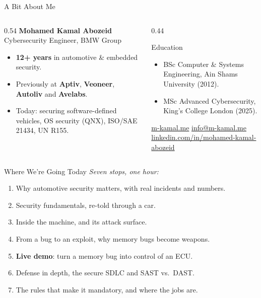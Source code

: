 
\begin{frame}{A Bit About Me}
  \begin{columns}[T]
    \begin{column}{0.54\textwidth}
      \textbf{Mohamed Kamal Abozeid}\\[2pt]
      {\small Cybersecurity Engineer, BMW Group}
      \vspace{3mm}
      \begin{itemize}
        \item \textbf{12+ years} in automotive \& embedded security.
        \item Previously at \textbf{Aptiv}, \textbf{Veoneer}, \textbf{Autoliv} and \textbf{Avelabs}.
        \item Today: securing software-defined vehicles, OS security (QNX), ISO/SAE 21434, UN R155.
      \end{itemize}
    \end{column}
    \begin{column}{0.44\textwidth}
      \begin{block}{Education}
        \begin{itemize}
          \item BSc Computer \& Systems Engineering, Ain Shams University (2012).
          \item MSc Advanced Cybersecurity, King's College London (2025).
        \end{itemize}
      \end{block}
      \vspace{2mm}
      {\footnotesize \url{m-kamal.me} \;\textbullet\; \href{mailto:info@m-kamal.me}{info@m-kamal.me}\\ \href{https://www.linkedin.com/in/mohamed-kamal-abozeid-814985b4/}{linkedin.com/in/mohamed-kamal-abozeid}}
    \end{column}
  \end{columns}
\end{frame}

\begin{frame}{Where We're Going Today}
  \textit{Seven stops, one hour:}
  \vspace{2.5mm}
  \begin{enumerate}\setlength{\itemsep}{4pt}
    \item Why automotive security matters, with real incidents and numbers.
    \item Security fundamentals, re-told through a car.
    \item Inside the machine, and its attack surface.
    \item From a bug to an exploit, why memory bugs become weapons.
    \item \alert{\textbf{Live demo}: turn a memory bug into control of an ECU.}
    \item Defense in depth, the secure SDLC and SAST vs.\ DAST.
    \item The rules that make it mandatory, and where the jobs are.
  \end{enumerate}
\end{frame}

